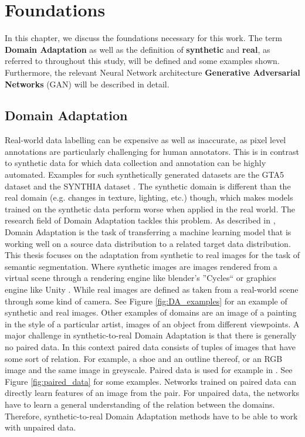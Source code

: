 \chapter{Foundations}
\label{sec:foundations}

In this chapter, we discuss the foundations necessary for this work. The term \textbf{Domain Adaptation} as well as the definition of \textbf{synthetic} and \textbf{real}, as referred to throughout this study, will be defined and some examples shown. Furthermore, the relevant Neural Network architecture \textbf{Generative Adversarial Networks} (GAN) will be described in detail.


\section{Domain Adaptation}
Real-world data labelling can be expensive as well as inaccurate, as pixel level annotations are particularly challenging for human annotators. This is in contrast to synthetic data for which data collection and annotation can be highly automated. Examples for such synthetically generated datasets are the GTA5 dataset \cite{Richter_2016_ECCV} and the SYNTHIA dataset \cite{RosCVPR16}. The synthetic domain is different than the real domain (e.g. changes in texture, lighting, etc.) though, which makes models trained on the synthetic data perform worse when applied in the real world. The research field of Domain Adaptation tackles this problem. As described in \cite{DBLP:journals/corr/Csurka17},
Domain Adaptation is the task of transferring a machine learning model that is working well on a source data distribution to a related target data distribution. This thesis focuses on the adaptation from synthetic to real images for the task of semantic segmentation. Where synthetic images are images rendered from a virtual scene through a rendering engine like blender's ''Cycles`` \cite{Cycles} or graphics engine like Unity \cite{Unity}. While real images are defined as taken from a real-world scene through some kind of camera. See Figure \ref{fig:DA_examples} for an example of synthetic and real images. Other examples of domains are an image of a painting in the style of a particular artist, images of an object from different viewpoints. A major challenge in synthetic-to-real Domain Adaptation is that there is generally no paired data. In this context paired data consists of tuples of images that have some sort of relation. For example, a shoe and an outline thereof, or an RGB image and the same image in greyscale. Paired data is used for example in \cite{DBLP:journals/corr/IsolaZZE16}. See Figure \ref{fig:paired_data} for some examples. Networks trained on paired data can directly learn features of an image from the pair. For unpaired data, the networks have to learn a general understanding of the relation between the domains. Therefore, synthetic-to-real Domain Adaptation methods have to be able to work with unpaired data. 

